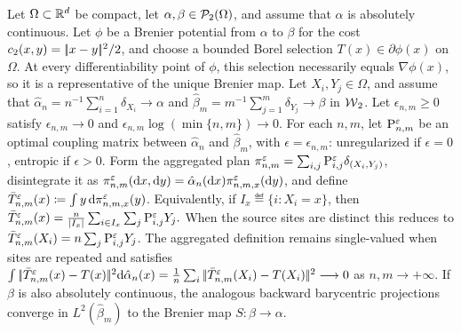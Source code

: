 \begin{prop}\label{prop-empirical-barycentric-map-consistency}
Let \(\Omega\subset\RR^d\) be compact, let \(\alpha,\beta\in\Pp_2(\Omega)\), and assume that \(\alpha\) is absolutely continuous. Let \(\phi\) be a Brenier potential from \(\alpha\) to \(\beta\) for the cost \(c_2(x,y)=\norm{x-y}^2/2\), and choose a bounded Borel selection \(T(x)\in\partial\phi(x)\) on \(\Omega\). At every differentiability point of \(\phi\), this selection necessarily equals \(\nabla\phi(x)\), so it is a representative of the unique Brenier map. Let \(X_i,Y_j\in\Omega\), and assume that \(\hat\alpha_n=n^{-1}\sum_{i=1}^n\delta_{X_i}\to\alpha\) and \(\hat\beta_m=m^{-1}\sum_{j=1}^m\delta_{Y_j}\to\beta\) in \(\Wass_2\). Let \(\epsilon_{n,m}\geq0\) satisfy \(\epsilon_{n,m}\to0\) and \(\epsilon_{n,m}\log(\min\{n,m\})\to0\). For each \(n,m\), let \(\P_{n,m}^{\epsilon}\) be an optimal coupling matrix between \(\hat\alpha_n\) and \(\hat\beta_m\), with \(\epsilon=\epsilon_{n,m}\): unregularized if \(\epsilon=0\), entropic if \(\epsilon>0\). Form the aggregated plan \(\pi_{n,m}^\epsilon=\sum_{i,j}\P_{i,j}^\epsilon\delta_{(X_i,Y_j)}\), disintegrate it as \(\pi_{n,m}^\epsilon(\d x,\d y)=\hat\alpha_n(\d x)\pi_{n,m,x}^\epsilon(\d y)\), and define
$\bar T_{n,m}^{\epsilon}(x) \eqdef \int y\,\d\pi_{n,m,x}^\epsilon(y)$.
Equivalently, if \(I_x\eqdef\{i:X_i=x\}\), then
\(\bar T_{n,m}^{\epsilon}(x) = \frac{n}{|I_x|}\sum_{i\in I_x}\sum_j\P_{i,j}^{\epsilon}Y_j.\)
When the source sites are distinct this reduces to \(\bar T_{n,m}^{\epsilon}(X_i)=n\sum_j\P_{i,j}^{\epsilon}Y_j\). The aggregated definition remains single-valued when sites are repeated and satisfies
\(\int \norm{\bar T_{n,m}^{\epsilon}(x)-T(x)}^2 \d\hat\alpha_n(x) = \frac1n\sum_i \norm{\bar T_{n,m}^{\epsilon}(X_i)-T(X_i)}^2 \longrightarrow0\)
as \(n,m\to+\infty\).
If \(\beta\) is also absolutely continuous, the analogous backward barycentric projections converge in \(L^2(\hat\beta_m)\) to the Brenier map \(S:\beta\to\alpha\).
\end{prop}
